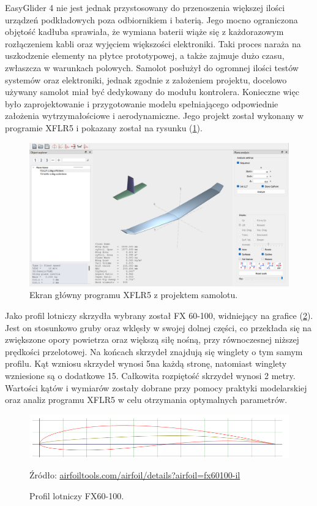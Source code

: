 \documentclass[12pt, a4paper]{article}
\let\oldref\ref
\renewcommand{\ref}[1]{(\oldref{#1})}
\begin{document}
EasyGlider 4 nie jest jednak przystosowany do przenoszenia większej ilości urządzeń podkładowych poza odbiornikiem i baterią. Jego mocno ograniczona objętość kadłuba sprawiała, że wymiana baterii wiąże się z każdorazowym rozłączeniem kabli oraz wyjęciem większości elektroniki. Taki proces naraża na uszkodzenie elementy na płytce prototypowej, a także zajmuje dużo czasu, zwłaszcza w warunkach polowych. Samolot posłużył do ogromnej ilości testów systemów oraz elektroniki, jednak zgodnie z założeniem projektu, docelowo używany samolot miał być dedykowany do modułu kontrolera. Konieczne więc było zaprojektowanie i przygotowanie modelu spełniającego odpowiednie założenia wytrzymałościowe i aerodynamiczne. Jego projekt został wykonany w programie XFLR5 i pokazany został na rysunku \ref{fig:xflr}.

 \begin{figure}[ht]
    \centering
    \includegraphics[width=1\textwidth]{xflr}
    \caption{Ekran główny programu XFLR5 z projektem samolotu.}
    \label{fig:xflr}
\end{figure}

Jako profil lotniczy skrzydła wybrany został FX 60-100, widniejący na grafice \ref{fig:fx60}. Jest on stosunkowo gruby oraz wklęsły w swojej dolnej części, co przekłada się na zwiększone opory powietrza oraz większą siłę nośną, przy równoczesnej niższej prędkości przelotowej. Na końcach skrzydeł znajdują się winglety o tym samym profilu. Kąt wzniosu skrzydeł wynosi 5\textdegree na każdą stronę, natomiast winglety wzniesione są o dodatkowe 15\textdegree. Całkowita rozpiętość skrzydeł wynosi 2 metry. Wartości kątów i wymiarów zostały dobrane przy pomocy praktyki modelarskiej oraz analiz programu XFLR5 w celu otrzymania optymalnych parametrów.

 \begin{figure}[ht]
    \centering
    \includegraphics[width=1\textwidth]{fx60}
    \caption{Profil lotniczy FX60-100.}
    \small Źródło: \url{airfoiltools.com/airfoil/details?airfoil=fx60100-il}
    \label{fig:fx60}
\end{figure}
\end{document}
